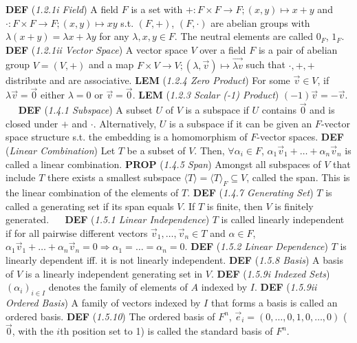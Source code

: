 \documentclass{article}
\newcommand{\wde}[1]{\textcolor{defc}{\textbf{DEF}} (\textcolor{namec}{\textit{#1}})}
\newcommand{\wl}[1]{\textcolor{lemc}{\textbf{LEM}} (\textcolor{namec}{\textit{#1}})}
\newcommand{\wpr}[1]{\textcolor{propc}{\textbf{PROP}} (\textcolor{namec}{\textit{#1}})}
\begin{document}
\begin{multicols}{2}

  \noindent %
  \wde{1.2.1i Field} A field $F$ is a set with $+ : F \times F \to F; (x, y) \mapsto x + y$ and $\cdot : F \times F \to F; (x, y) \mapsto xy$ s.t. $(F,+)$, $(F,\cdot)$ are abelian groups with $\lambda(x + y) = \lambda x + \lambda y$  for any $\lambda, x, y \in F$. The neutral elements are called $0_{F}$, $1_{F}$.
  \wde{1.2.1ii Vector Space} A vector space $V$ over a field $F$ is a pair of abelian group $V=(V, +)$ and a map $F \times V \to V; (\lambda, \vec{v}) \mapsto \vec{\lambda v}$ such that $\cdot,+,+$ distribute and are associative.
  \wl{1.2.4 Zero Product} For some $\vec{v} \in V$, if $\lambda\vec{v} = \vec{0}$ either $\lambda=0$ or $\vec{v}=\vec{0}$.
  \wl{1.2.3 Scalar (-1) Product} $(-1)\vec{v} = -\vec{v}$.
\ \
  \noindent %
  \wde{1.4.1 Subspace} A subset $U$ of $V$ is a subspace if $U$ contains $\vec{0}$ and is closed under $+$ and $\cdot$. Alternatively, $U$ is a subspace if it can be given an $F$-vector space structure s.t. the embedding is a homomorphism of $F$-vector spaces.
  \wde{Linear Combination} Let $T$ be a subset of $V$. Then, $\forall \alpha_{i} \in F$, $\alpha_{1}\vec{v}_{1} + \dots + \alpha_{n}\vec{v}_{n}$ is called a linear combination.
  \wpr{1.4.5 Span} Amongst all subspaces of $V$ that include $T$ there exists a smallest subspace $\langle T \rangle = \langle T \rangle_{F} \subseteq V$, called the span. This is the linear combination of the elements of $T$.
  \wde{1.4.7 Generating Set} $T$ is called a generating set if its span equals $V$. If $T$ is finite, then $V$ is finitely generated.
\ \
  \noindent %
  \wde{1.5.1 Linear Independence} $T$ is called linearly independent if for all pairwise different vectors $\vec{v}_{1},\dots,\vec{v}_{n} \in T$ and $\alpha \in F$, $\alpha_{1}\vec{v}_{1} + \dots + \alpha_{n}\vec{v}_{n} = 0 \Rightarrow \alpha_{1} = \dots = \alpha_{n} = 0$.
  \wde{1.5.2 Linear Dependence} $T$ is linearly dependent iff. it is not linearly independent.
  \wde{1.5.8 Basis} A basis of $V$ is a linearly independent generating set in $V$.
  \wde{1.5.9i Indexed Sets} $(\alpha_{i})_{i \in I}$ denotes the family of elements of $A$ indexed by $I$.
  \wde{1.5.9ii Ordered Basis} A family of vectors indexed by $I$ that forms a basis is called an ordered basis.
  \wde{1.5.10} The ordered basis of $F^{n}$, $\vec{e}_{i} = (0,\dots,0,1,0,\dots,0)$ ($\vec{0}$, with the $i$th position set to 1) is called the standard basis of $F^{n}$.

\end{multicols}
\end{document}
